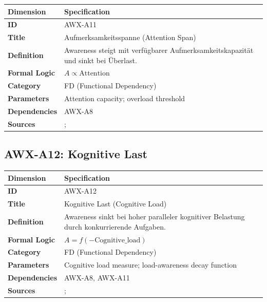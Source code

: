 \begin{table}[htbp]
\small
\begin{tabular}{p{3cm}p{11cm}}
\toprule
\textbf{Dimension} & \textbf{Specification} \\
\midrule
\textbf{ID} & AWX-A11 \\
\textbf{Title} & Aufmerksamkeitsspanne (Attention Span) \\
\textbf{Definition} & Awareness steigt mit verfügbarer Aufmerksamkeitskapazität und sinkt bei Überlast. \\
\textbf{Formal Logic} & $A \propto \text{Attention}$ \\
\textbf{Category} & FD (Functional Dependency) \\
\textbf{Parameters} & Attention capacity; overload threshold \\
\textbf{Dependencies} & AWX-A8 \\
\textbf{Sources} & \citet{PAP-kahneman2003maps}; \citet{sims2003implications} \\
\bottomrule
\end{tabular}
\end{table}


\subsection{AWX-A12: Kognitive Last}

\begin{table}[htbp]
\small
\begin{tabular}{p{3cm}p{11cm}}
\toprule
\textbf{Dimension} & \textbf{Specification} \\
\midrule
\textbf{ID} & AWX-A12 \\
\textbf{Title} & Kognitive Last (Cognitive Load) \\
\textbf{Definition} & Awareness sinkt bei hoher paralleler kognitiver Belastung durch konkurrierende Aufgaben. \\
\textbf{Formal Logic} & $A = f(-\text{Cognitive\_load})$ \\
\textbf{Category} & FD (Functional Dependency) \\
\textbf{Parameters} & Cognitive load measure; load-awareness decay function \\
\textbf{Dependencies} & AWX-A8, AWX-A11 \\
\textbf{Sources} & \citet{sweller1988cognitive}; \citet{lavie2005distracted} \\
\bottomrule
\end{tabular}
\end{table}

